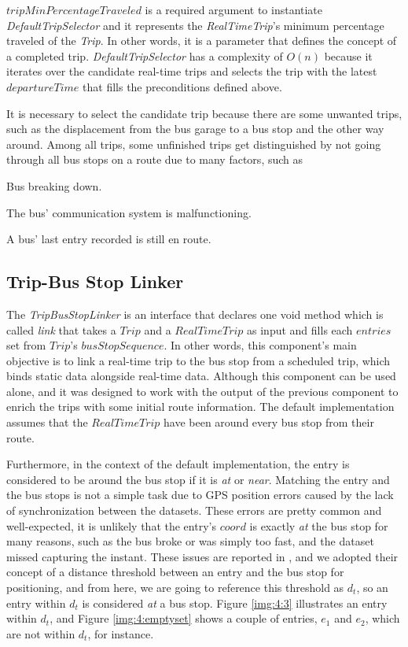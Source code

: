 $tripMinPercentageTraveled$ is a required argument to instantiate 
\textit{DefaultTripSelector} and it represents the \textit{RealTimeTrip}'s minimum percentage traveled of the \textit{Trip}. In other words, it is a parameter that
defines the concept of a completed trip. \textit{DefaultTripSelector} has 
a complexity of $O(n)$ because it iterates over the candidate real-time trips
and selects the trip with the latest $departureTime$ that fills the preconditions defined above.

It is necessary to select the candidate trip because there are some unwanted trips, such as the displacement from the bus 
garage to a bus stop and the other way around. Among all trips, some
unfinished trips get distinguished by not going through all bus stops on a route
due to many factors, such as
\begin{enumerate*}
  \item Bus breaking down.
  \item The bus' communication system is malfunctioning.
  \item A bus' last entry recorded is still en route.
\end{enumerate*}

\subsection{Trip-Bus Stop Linker}
The \textit{TripBusStopLinker} is an interface that declares one void 
method which is called \textit{link} that takes a $Trip$ and a $RealTimeTrip$ as input
and fills each $entries$ set from $Trip$'s $busStopSequence$.
In other words, this component's main objective is to link 
a real-time trip to the bus stop from a scheduled trip,
which binds static data alongside real-time data. 
Although this component can be used alone,
and it was designed to work with the output of the previous component
to enrich the trips with some initial route information.
The default implementation assumes that the $RealTimeTrip$ have
been around every bus stop from their route. 

Furthermore, in the context of the default implementation, 
the entry is considered to be around the bus stop if it is {\em at} or
{\em near}. Matching the entry and the bus stops is not a simple task due to GPS position errors caused by the
lack of synchronization between the datasets. 
These errors are pretty common 
and well-expected, it is unlikely that the entry's $coord$ is exactly 
{\em at} the bus stop for many reasons, such as the bus broke or was simply too fast, and the dataset missed capturing the instant. 
These issues are reported in 
, and 
we adopted their concept of a distance threshold between an entry and the bus stop for positioning, and from here, we are going to reference this threshold as $d_t$, so an entry 
within $d_t$ is considered {\em at} a bus stop. Figure \ref{img:4:3} illustrates an
entry within $d_t$, and Figure \ref{img:4:emptyset} shows a couple of entries, $e_1$ and $e_2$, which are not 
within $d_t$, for instance.



